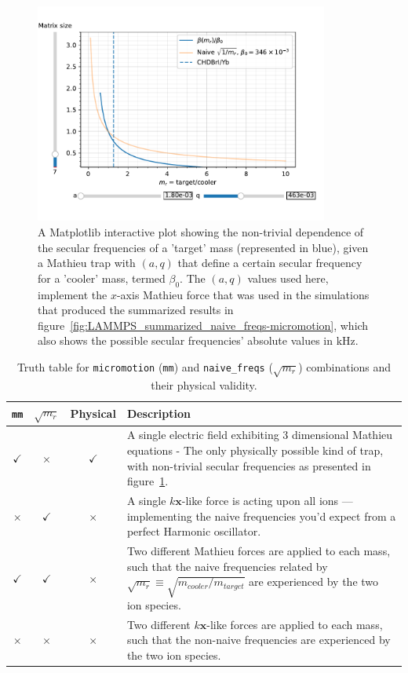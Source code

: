 \begin{figure}
	\begin{center}
		\includegraphics[width=0.86\textwidth]{graphics/mathieu-mass-dep.pdf}
	\end{center}
	\caption{A Matplotlib interactive plot showing the non-trivial dependence of the secular frequencies of a 'target' mass (represented in blue), given a Mathieu trap with $(a,q)$ that define a certain secular frequency for a 'cooler' mass, termed $\beta_0$. The $(a,q)$ values used here, implement the $x$-axis Mathieu force that was used in the simulations that produced the summarized results in figure~\ref{fig:LAMMPS_summarized_naive_freqs-micromotion}, which also shows the possible secular frequencies' absolute values in $\mathrm{kHz}$.}
	\label{fig:mathieu-mass-dep}
\end{figure}

\begin{table}[h]
\centering
\begin{tabularx}{\textwidth}{cccX}
\toprule
\texttt{mm} & $\sqrt{m_r}$ & \textbf{Physical} & \textbf{Description} \\
\midrule
$\checkmark$ & $\times$ & $\checkmark$ & A single electric field exhibiting 3 dimensional Mathieu equations - The only physically possible kind of trap, with non-trivial secular frequencies as presented in figure~\ref{fig:mathieu-mass-dep}. \\
\midrule
$\times$ & $\checkmark$ & $\times$ & A single \(k \mathbf{x}\)-like force is acting upon all ions — implementing the naive frequencies you'd expect from a perfect Harmonic oscillator. \\
\midrule
$\checkmark$ & $\checkmark$ & $\times$ & Two different Mathieu forces are applied to each mass, such that the naive frequencies related by $\sqrt{m_r} \equiv \sqrt{m_{cooler}/m_{target}}$ are experienced by the two ion species. \\
\midrule
$\times$ & $\times$ & $\times$ & Two different \(k \mathbf{x}\)-like forces are applied to each mass, such that the non-naive frequencies are experienced by the two ion species. \\
\bottomrule
\end{tabularx}
\caption{Truth table for \texttt{micromotion} (\texttt{mm}) and \texttt{naive\_freqs} ($\sqrt{m_r}$) combinations and their physical validity.}
\label{tbl:naive_freqs-micromotion}
\end{table}

